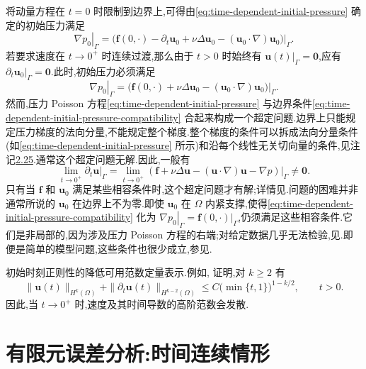\begin{note}[趋近初始时刻的正则性与相容条件]
\label{note:time-dependent-initial-compatibility}
将动量方程在 $t=0$ 时限制到边界上,可得由\cref{eq:time-dependent-initial-pressure} 确定的初始压力满足
\[
  \left.\nabla p_0\right|_\Gamma
    =\left.\bigl(\bm{f}(0,\cdot)-\partial_t\bm{u}_0
      +\nu\Delta\bm{u}_0
      -(\bm{u}_0\cdot\nabla)\bm{u}_0\bigr)\right|_\Gamma.
\]
若要求速度在 $t\to0^+$ 时连续过渡,那么由于 $t>0$ 时始终有 $\bm{u}(t)|_\Gamma=\bm{0}$,应有 $\left.\partial_t\bm{u}_0\right|_\Gamma=\bm{0}$.此时,初始压力必须满足
\begin{equation}\label{eq:time-dependent-initial-pressure-compatibility}
  \left.\nabla p_0\right|_\Gamma
    =\left.\bigl(\bm{f}(0,\cdot)+\nu\Delta\bm{u}_0
      -(\bm{u}_0\cdot\nabla)\bm{u}_0\bigr)\right|_\Gamma.
\end{equation}
然而,压力 Poisson 方程\cref{eq:time-dependent-initial-pressure} 与边界条件\cref{eq:time-dependent-initial-pressure-compatibility} 合起来构成一个超定问题.边界上只能规定压力梯度的法向分量,不能规定整个梯度.整个梯度的条件可以拆成法向分量条件(如\cref{eq:time-dependent-initial-pressure} 所示)和沿每个线性无关切向量的条件,见注记\hyperref[note:pressure-boundary-condition]{2.25}.通常这个超定问题无解.因此,一般有
\[
  \lim_{t\to0^+}\left.\partial_t\bm{u}\right|_\Gamma
    =\lim_{t\to0^+}
      \left.(\bm{f}+\nu\Delta\bm{u}
        -(\bm{u}\cdot\nabla)\bm{u}-\nabla p)\right|_\Gamma
    \ne\bm{0}.
\]
只有当 $\bm{f}$ 和 $\bm{u}_0$ 满足某些相容条件时,这个超定问题才有解;详情见\textcite{Temam1982}.问题的困难并非通常所说的 $\bm{u}_0$ 在边界上不为零.即使 $\bm{u}_0$ 在 $\Omega$ 内紧支撑,使得\cref{eq:time-dependent-initial-pressure-compatibility} 化为 $\left.\nabla p_0\right|_\Gamma=\left.\bm{f}(0,\cdot)\right|_\Gamma$,仍须满足这些相容条件.它们是非局部的,因为涉及压力 Poisson 方程的右端;对给定数据几乎无法检验,见\textcite{HeywoodRannacher1982}.即便是简单的模型问题,这些条件也很少成立,参见\textcite{HeywoodRannacher1988}.

初始时刻正则性的降低可用范数定量表示.例如,\textcite[定理 2.5]{HeywoodRannacher1982} 证明,对 $k\ge2$ 有
\[
  \|\bm{u}(t)\|_{H^k(\Omega)}
    +\|\partial_t\bm{u}(t)\|_{H^{k-2}(\Omega)}
  \le C\bigl(\min\{t,1\}\bigr)^{1-k/2},
  \qquad t>0.
\]
因此,当 $t\to0^+$ 时,速度及其时间导数的高阶范数会发散.
\end{note}

\section{有限元误差分析:时间连续情形}
\label{sec:time-dependent-fem-continuous}

